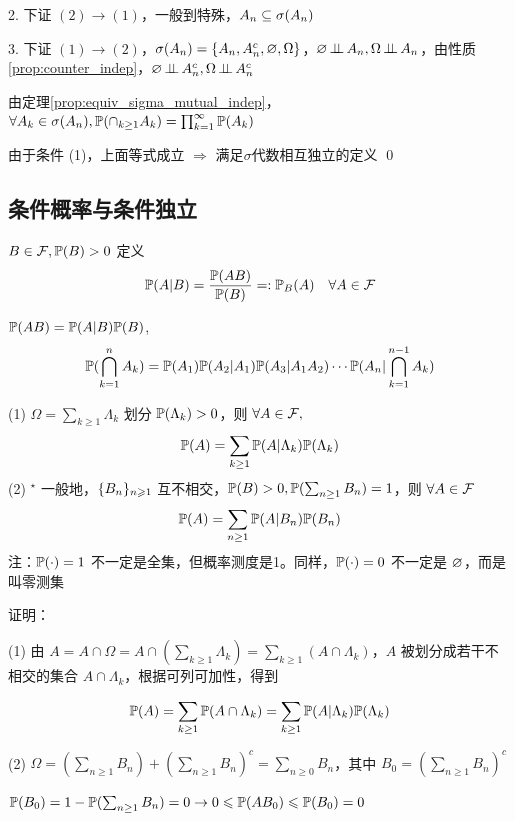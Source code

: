 2. 下证 $(2)\rightarrow (1)$，一般到特殊，$A_n\subseteq \sigma(A_n)$

3. 下证 $(1)\rightarrow (2)$，$\sigma(A_n)=\{A_n,A_n^c, \varnothing, \Omega\}$，$\varnothing\operatorname{\perp\!\!\!\perp} A_n, \Omega\operatorname{\perp\!\!\!\perp} A_n$，由性质\ref{prop:counter_indep}，$\varnothing\operatorname{\perp\!\!\!\perp} A_n^c, \Omega\operatorname{\perp\!\!\!\perp} A_n^c$

由定理\ref{prop:equiv_sigma_mutual_indep}，$\forall A_k\in \sigma(A_n), \mathbb{P}(\cap_{k\geq 1}A_k)=\prod_{k=1}^{\infty}\mathbb{P}(A_k)$

由于条件 (1)，上面等式成立 $\Rightarrow$ 满足$\sigma$代数相互独立的定义 \qed

\subsection{条件概率与条件独立}

\begin{definition}[条件概率]\label{def:con_prob}
    $B\in \mathcal{F}, \mathbb{P}(B)>0$ 定义
    \[
    \mathbb{P}(A|B)=\frac{\mathbb{P}(AB)}{\mathbb{P}(B)}=: \mathbb{P}_B(A)\quad \forall A\in \mathcal{F}
    \]
\end{definition}

\begin{theorem}[乘法公式]
    $\mathbb{P}(AB)=\mathbb{P}(A|B)\mathbb{P}(B)$,
    \[
    \mathbb{P}(\bigcap_{k=1}^{n}A_k)=\mathbb{P}(A_1)\mathbb{P}(A_2|A_1)\mathbb{P}(A_3|A_1A_2)\cdots \mathbb{P}(A_n|\bigcap_{k=1}^{n-1}A_k)
    \]
\end{theorem}

\begin{theorem}[全概公式]
    (1) $\Omega=\sum_{k\geq 1}\Lambda_k$ 划分 $\mathbb{P}(\Lambda_k)>0$，则 $\forall A\in \mathcal{F},$
    \[
    \mathbb{P}(A)=\sum_{k\geq 1}\mathbb{P}(A|\Lambda_k)\mathbb{P}(\Lambda_k)
    \]
    (2) $^\star$ 一般地，$\{{B}_{n}\}_{n \geqslant 1}$ 互不相交，$\mathbb{P}(B)>0, \mathbb{P}(\sum_{n\geq 1}B_n)=1$，则 $\forall A\in \mathcal{F}$
    \[
    \mathbb{P}(A)=\sum_{n\geq 1}\mathbb{P}(A|B_n)\mathbb{P}(B_n)
    \]
    注：$\mathbb{P}(\cdot)=1$ 不一定是全集，但概率测度是1。同样，$\mathbb{P}(\cdot)=0$ 不一定是 $\varnothing$，而是叫零测集
\end{theorem}

证明：

(1) 由 $A=A\cap\Omega=A\cap (\sum_{k\geq 1}\Lambda_k)=\sum_{k\geq 1}(A\cap \Lambda_k)$，$A$ 被划分成若干不相交的集合 $A\cap \Lambda_k$，根据可列可加性，得到 

\[
\mathbb{P}(A)=\sum_{k\geq 1}\mathbb{P}(A\cap \Lambda_k)=\sum_{k\geq 1}\mathbb{P}(A|\Lambda_k)\mathbb{P}(\Lambda_k)
\]

(2) $\Omega=(\sum_{n\geq 1}B_n)+(\sum_{n\geq 1}B_n)^c=\sum_{n\geq 0}B_n$，其中 $B_0=(\sum_{n\geq 1}B_n)^c$

$\mathbb{P}(B_0)=1-\mathbb{P}(\sum_{n\geq 1}B_n)=0\rightarrow 0\leqslant \mathbb{P}(AB_0)\leqslant \mathbb{P}(B_0)=0$

